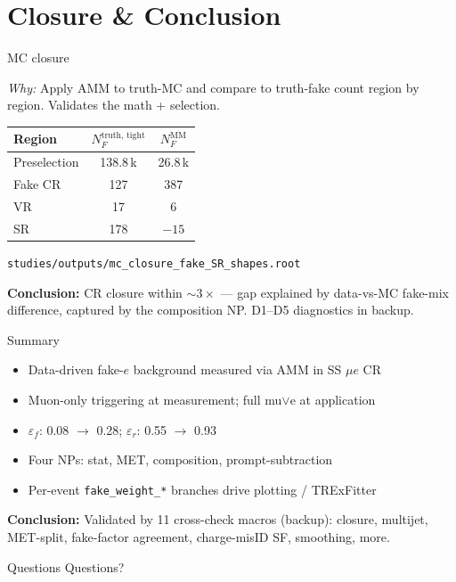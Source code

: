 \documentclass[10pt,aspectratio=169]{beamer}
\newcommand{\motiv}[1]{%
  \begin{tcolorbox}[colback=motivbg,colframe=motivbord,arc=1.5mm,boxrule=0.5pt,
                    left=1mm,right=1mm,top=0.5mm,bottom=0.5mm]
  \footnotesize\textit{Why:} #1
  \end{tcolorbox}}
\newcommand{\concl}[1]{%
  \begin{tcolorbox}[colback=conclbg,colframe=conclbord,arc=1.5mm,boxrule=0.6pt,
                    left=1mm,right=1mm,top=0.5mm,bottom=0.5mm]
  \footnotesize\textbf{Conclusion:} #1
  \end{tcolorbox}}
\newcommand{\fname}[1]{\texttt{\tiny #1}}
\begin{document}
\section{Closure \& Conclusion}

\begin{frame}{MC closure}
  \motiv{Apply AMM to truth-MC and compare to truth-fake count region by
  region. Validates the math + selection.}
  \footnotesize
  \begin{tabular}{lcc}
    \toprule
    Region & $N_F^{\text{truth, tight}}$ & $N_F^{\text{MM}}$ \\
    \midrule
    Preselection & 138.8\,k & 26.8\,k \\
    Fake CR      & 127      & 387 \\
    VR           & 17       & 6 \\
    SR           & 178      & $-15$ \\
    \bottomrule
  \end{tabular}
  \fname{studies/outputs/mc\_closure\_fake\_SR\_shapes.root}
  \concl{CR closure within $\sim 3\times$ — gap explained by data-vs-MC
  fake-mix difference, captured by the composition NP.
  D1--D5 diagnostics in backup.}
\end{frame}

\begin{frame}{Summary}
  \begin{itemize}\setlength{\itemsep}{0pt}
    \item Data-driven fake-$e$ background measured via AMM in SS $\mu e$ CR
    \item Muon-only triggering at measurement; full mu$\lor$e at application
    \item $\varepsilon_f$: 0.08 $\to$ 0.28; $\varepsilon_r$: 0.55 $\to$ 0.93
    \item Four NPs: stat, MET, composition, prompt-subtraction
    \item Per-event \fname{fake\_weight\_*} branches drive plotting / TRExFitter
  \end{itemize}
  \concl{Validated by 11 cross-check macros (backup): closure, multijet,
  MET-split, fake-factor agreement, charge-misID SF, smoothing, more.}
\end{frame}

\begin{frame}{Questions}
  \vfill
  \centering
  \LARGE Questions?
  \vfill
  \vfill
\end{frame}
\end{document}
